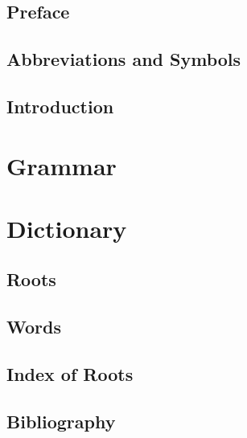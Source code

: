 \documentclass[paper=6in:9in]{scrbook}
\title{\PIE{Leg'tik''om}{noasterisk, circumflex}}
\author{A Proto-Indo-European Dictionary}
\date{Author}
\begin{document}
\frontmatter
\maketitle

\newpage

\tableofcontents
\newpage

\chapter{Preface}

\chapter{Abbreviations and Symbols}

\mainmatter
\chapter{Introduction}

\part{Grammar}

\part{Dictionary}

\chapter{Roots}



\newpage
\chapter{Words}

\backmatter
\chapter{Index of Roots}

\chapter{Bibliography}


\end{document}
